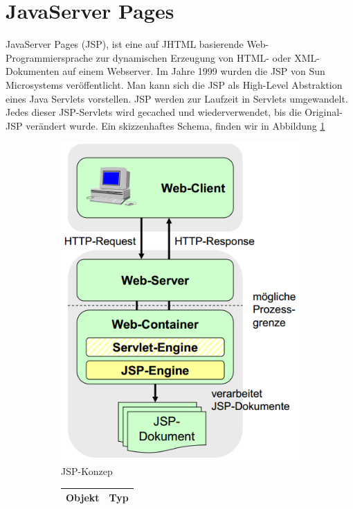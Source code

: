 
\section{JavaServer Pages}

JavaServer Pages (JSP), ist eine auf JHTML basierende Web-Programmiersprache zur dynamischen Erzeugung von HTML- oder XML-Dokumenten auf einem Webserver. Im Jahre 1999 wurden die JSP von Sun Microsystems veröffentlicht. Man kann sich die JSP als High-Level Abstraktion eines Java Servlets vorstellen. JSP werden zur Laufzeit in Servlets umgewandelt. Jedes dieser JSP-Servlets wird gecached und wiederverwendet, bis die Original-JSP verändert wurde. Ein skizzenhaftes Schema, finden wir in Abbildung \ref{fig:jsp}

\begin{figure}[h]
\begin{subfigure}[b]{.4\textwidth}
 \includegraphics[scale=0.3]{Bilder/jsp.png}
 \caption{JSP-Konzep}
 \label{fig:jsp}
\end{subfigure}
\begin{subfigure}[b]{.5\textwidth}
\begin{tabular}{|l|l|}
\hline
\textbf{Objekt} & \textbf{Typ} \\\hline

\end{tabular}
\end{subfigure}
\end{figure}
